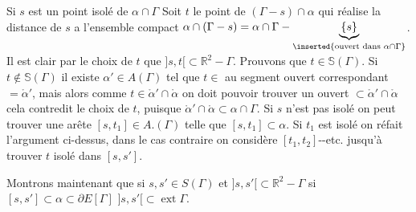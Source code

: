 Si $s$ est un point isolé de $\alpha\cap\Gamma$ Soit $t$ le point de $(\Gamma-s)\cap\alpha$ qui réalise la distance de $s$ a l'ensemble compact $\alpha\cap(\Gamma-s)=\alpha\cap\Gamma-\underbrace{\{s\}}_{\inserted{\text{ouvert dans }\alpha\cap\Gamma}}$. Il est clair par le choix de $t$ que $]s,t[\subset\mathbb{R}^{2}-\Gamma$. Prouvons que $t\in\mathbb{S}(\Gamma)$. Si $t\notin\mathbb{S}(\Gamma)$ il existe $\alpha'\in A(\Gamma)$ tel que $t\in$ au segment ouvert correspondant $=\mathring{\alpha}'$, mais alors comme $t\in\mathring{\alpha}'\cap\mathring{\alpha}$ on doit pouvoir trouver un ouvert $\subset\mathring{\alpha}'\cap\mathring{\alpha}$  cela contredit le choix de $t$, puisque $\mathring{\alpha}'\cap\mathring{\alpha}\subset\alpha\cap\Gamma$. Si $s$ n'est pas isolé on peut trouver une arête $[s,t_1]\in A.(\Gamma)$ telle que $[s,t_1]\subset\alpha$. Si $t_1$ est isolé on réfait l'argument ci-dessus, dans le cas contraire on considère $[t_1,t_2]$-{}-etc. jusqu'à trouver $t$ isolé dans $[s,s']$.

Montrons maintenant que si $s,s'\in S(\Gamma)$ et $]s,s'[\subset\mathbb{R}^{2}-\Gamma$ si $[s,s']\subset\alpha\subset\partial E[\Gamma]$ $]s,s'[\subset\operatorname{ext}\Gamma$.
